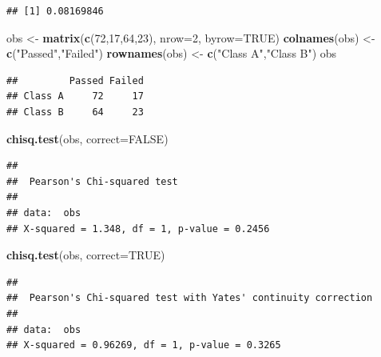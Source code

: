 \documentclass[
]{article}
\newenvironment{Shaded}{\begin{snugshade}}{\end{snugshade}}
\newcommand{\AttributeTok}[1]{\textcolor[rgb]{0.13,0.29,0.53}{#1}}
\newcommand{\ConstantTok}[1]{\textcolor[rgb]{0.56,0.35,0.01}{#1}}
\newcommand{\DecValTok}[1]{\textcolor[rgb]{0.00,0.00,0.81}{#1}}
\newcommand{\FunctionTok}[1]{\textcolor[rgb]{0.13,0.29,0.53}{\textbf{#1}}}
\newcommand{\NormalTok}[1]{#1}
\newcommand{\OtherTok}[1]{\textcolor[rgb]{0.56,0.35,0.01}{#1}}
\newcommand{\StringTok}[1]{\textcolor[rgb]{0.31,0.60,0.02}{#1}}
\begin{document}
\begin{verbatim}
## [1] 0.08169846
\end{verbatim}

\begin{Shaded}
\begin{Highlighting}[]
\NormalTok{obs }\OtherTok{\textless{}{-}} \FunctionTok{matrix}\NormalTok{(}\FunctionTok{c}\NormalTok{(}\DecValTok{72}\NormalTok{,}\DecValTok{17}\NormalTok{,}\DecValTok{64}\NormalTok{,}\DecValTok{23}\NormalTok{), }\AttributeTok{nrow=}\DecValTok{2}\NormalTok{, }\AttributeTok{byrow=}\ConstantTok{TRUE}\NormalTok{)}
\FunctionTok{colnames}\NormalTok{(obs) }\OtherTok{\textless{}{-}} \FunctionTok{c}\NormalTok{(}\StringTok{"Passed"}\NormalTok{,}\StringTok{"Failed"}\NormalTok{)}
\FunctionTok{rownames}\NormalTok{(obs) }\OtherTok{\textless{}{-}} \FunctionTok{c}\NormalTok{(}\StringTok{"Class A"}\NormalTok{,}\StringTok{"Class B"}\NormalTok{)}
\NormalTok{obs}
\end{Highlighting}
\end{Shaded}

\begin{verbatim}
##         Passed Failed
## Class A     72     17
## Class B     64     23
\end{verbatim}

\begin{Shaded}
\begin{Highlighting}[]
\FunctionTok{chisq.test}\NormalTok{(obs, }\AttributeTok{correct=}\ConstantTok{FALSE}\NormalTok{)}
\end{Highlighting}
\end{Shaded}

\begin{verbatim}
## 
##  Pearson's Chi-squared test
## 
## data:  obs
## X-squared = 1.348, df = 1, p-value = 0.2456
\end{verbatim}

\begin{Shaded}
\begin{Highlighting}[]
\FunctionTok{chisq.test}\NormalTok{(obs, }\AttributeTok{correct=}\ConstantTok{TRUE}\NormalTok{)}
\end{Highlighting}
\end{Shaded}

\begin{verbatim}
## 
##  Pearson's Chi-squared test with Yates' continuity correction
## 
## data:  obs
## X-squared = 0.96269, df = 1, p-value = 0.3265
\end{verbatim}
\end{document}

